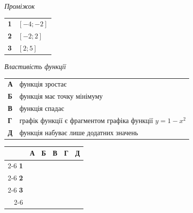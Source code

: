 \documentclass[14pt]{extarticle}
\begin{document}
\vspace{0.2cm}

\noindent
\begin{minipage}[t]{0.55\textwidth}
    \vspace{0pt}
    \textit{Проміжок} \par \vspace{0.2cm}
    \begin{tabular}{@{}p{0.5cm} p{3cm}@{}}
    \textbf{1} & $[-4; -2]$ \\[0.3cm]
    \textbf{2} & $[-2; 2]$ \\[0.3cm]
    \textbf{3} & $[2; 5]$ \\
    \end{tabular}
    
    \vspace{0.3cm}
    \textit{Властивість функції} \par \vspace{0.2cm}
    \begin{tabular}{@{}p{0.5cm} p{7cm}@{}}
    \textbf{А} & функція зростає \\[0.2cm]
    \textbf{Б} & функція має точку мінімуму \\[0.2cm]
    \textbf{В} & функція спадає \\[0.2cm]
    \textbf{Г} & графік функції є фрагментом графіка функції $y=1-x^2$ \\[0.2cm]
    \textbf{Д} & функція набуває лише додатних значень \\
    \end{tabular}
    
    \vspace{0.3cm}
    
    \begingroup
    \setlength{\tabcolsep}{4pt}
    \renewcommand{\arraystretch}{1.2}
    \small
    \begin{tabular}{r|c|c|c|c|c|}
         \multicolumn{1}{c}{} & \multicolumn{1}{c}{\textbf{А}} & \multicolumn{1}{c}{\textbf{Б}} & \multicolumn{1}{c}{\textbf{В}} & \multicolumn{1}{c}{\textbf{Г}} & \multicolumn{1}{c}{\textbf{Д}} \\ \cline{2-6}
         \textbf{1} & & & & & \\ \cline{2-6}
         \textbf{2} & & & & & \\ \cline{2-6}
         \textbf{3} & & & & & \\ \cline{2-6}
    \end{tabular}
    \endgroup
\end{minipage}%
\hfill
\end{document}
